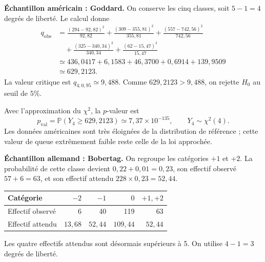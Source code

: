 {{\begin{minipage}{\linewidth}
\textbf{Échantillon américain : Goddard.} On conserve les cinq classes, soit $5-1=4$ degrés de liberté. Le calcul donne
\begin{align*}
q_{\mathrm{obs}}
&=\frac{(294-92{,}82)^2}{92{,}82}
 +\frac{(309-355{,}81)^2}{355{,}81}
 +\frac{(557-742{,}56)^2}{742{,}56}\\
&\quad+\frac{(325-340{,}34)^2}{340{,}34}
 +\frac{(62-15{,}47)^2}{15{,}47}\\
&\simeq436{,}0417+6{,}1583+46{,}3700+0{,}6914+139{,}9509\\
&\simeq629{,}2123.
\end{align*}
La valeur critique est $q_{4;0{,}95}\simeq9{,}488$. Comme $629{,}2123>9{,}488$, on rejette $H_0$ au seuil de $5\%$.

Avec l'approximation du $\chi^2$, la $p$-valeur est
\[
p_{\mathrm{val}}=\mathbb P(Y_4\geq629{,}2123)\simeq7{,}37\times10^{-135},
\qquad Y_4\sim\chi^2(4).
\]
Les données américaines sont très éloignées de la distribution de référence ; cette valeur de queue extrêmement faible reste celle de la loi approchée.
\end{minipage}

\begin{minipage}{\linewidth}
\textbf{Échantillon allemand : Bobertag.} On regroupe les catégories $+1$ et $+2$. La probabilité de cette classe devient $0{,}22+0{,}01=0{,}23$, son effectif observé $57+6=63$, et son effectif attendu $228\times0{,}23=52{,}44$.
\begin{center}
\begin{tabular}{lrrrr}
\hline
Catégorie & $-2$ & $-1$ & $0$ & $+1,+2$ \\ \hline
Effectif observé & 6 & 40 & 119 & 63 \\
Effectif attendu & $13{,}68$ & $52{,}44$ & $109{,}44$ & $52{,}44$ \\ \hline
\end{tabular}
\end{center}
Les quatre effectifs attendus sont désormais supérieurs à 5. On utilise $4-1=3$ degrés de liberté.
\end{minipage}

}}
